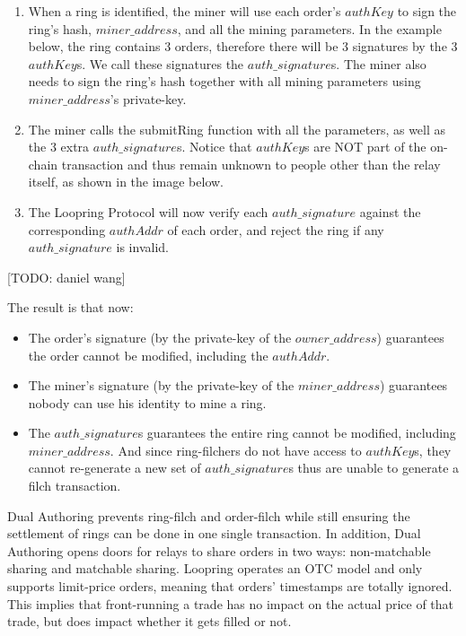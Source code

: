 \documentclass[UTF8,nofonts]{article}
\begin{document}
\begin{multicols}{2}
\begin{enumerate}
	\item When a ring is identified, the miner will use each order's $authKey$ to sign the ring's hash, $miner\_address$, and all the mining parameters. In the example below, the ring contains 3 orders, therefore there will be 3 signatures by the 3 $authKey$s. We call these signatures the $auth\_signature$s. The miner also needs to sign the ring's hash together with all mining parameters using $miner\_address$'s private-key.

	\item The miner calls the submitRing function with all the parameters, as well as the 3 extra $auth\_signature$s. Notice that $authKey$s are NOT part of the on-chain transaction and thus remain unknown to people other than the relay itself, as shown in the image below.

	\item The Loopring Protocol will now verify each $auth\_signature$ against the corresponding $authAddr$ of each order, and reject the ring if any $auth\_signature$ is invalid.
 
\end{enumerate}
[TODO: daniel wang]


The result is that now:

\begin{itemize}

	\item  The order’s signature (by the private-key of the $owner\_address$) guarantees the order cannot be modified, including the $authAddr$.
	\item  The miner’s signature (by the private-key of the $miner\_address$) guarantees nobody can use his identity to mine a ring.
	\item  The $auth\_signature$s guarantees the entire ring cannot be modified, including $miner\_address$. And since ring-filchers do not have access to $authKey$s, they cannot re-generate a new set of $auth\_signature$s thus are unable to generate a filch transaction.

\end{itemize}

Dual Authoring prevents ring-filch and order-filch while still ensuring the settlement of rings can be done in one single transaction. In addition, Dual Authoring opens doors for relays to share orders in two ways: non-matchable sharing and matchable sharing. Loopring operates an OTC model and only supports limit-price orders, meaning that orders’ timestamps are totally ignored. This implies that front-running a trade has no impact on the actual price of that trade, but does impact whether it gets filled or not.


\end{multicols}
\end{document}
